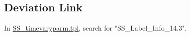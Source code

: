 
	

\subsection{Deviation Link}
In \href{https://github.com/nmfs-stock-synthesis/stock-synthesis/blob/main/SS_timevaryparm.tpl}{SS\_timevaryparm.tpl}, search for "SS\_Label\_Info\_14.3".\


